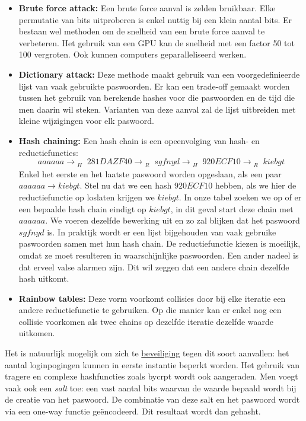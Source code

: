 \documentclass{report}
\begin{document}
	\begin{itemize} 
		\item[\info] \textbf{Brute force attack:} Een brute force aanval is zelden bruikbaar. Elke permutatie van bits uitproberen is enkel nuttig bij een klein aantal bits. Er bestaan wel methoden om de snelheid van een brute force aanval te verbeteren. Het gebruik van een GPU kan de snelheid met een factor 50 tot 100 vergroten. Ook kunnen computers geparalleliseerd werken.
		\item[\info] \textbf{Dictionary attack:} Deze methode maakt gebruik van een voorgedefinieerde lijst van vaak gebruikte paswoorden. Er kan een trade-off gemaakt worden tussen het gebruik van berekende hashes voor die paswoorden en de tijd die men daarin wil steken. Varianten van deze aanval zal de lijst uitbreiden met kleine wijzigingen voor elk paswoord.
		\item[\info] \textbf{Hash chaining:} Een hash chain is een opeenvolging van hash- en reductiefuncties:
		$$aaaaaa \rightarrow_{\substack{H}} 281DAZF40 \rightarrow_{\substack{R}}  sgfnyd \rightarrow_{\substack{H}}  920ECF10 \rightarrow_{\substack{R}}  kiebgt$$
		Enkel het eerste en het laatste paswoord worden opgeslaan, als een paar $aaaaaa \rightarrow kiebgt$. Stel nu dat we een hash $920ECF10$ hebben, als we hier de reductiefunctie op loslaten krijgen we $kiebgt$.  In onze tabel zoeken we op of er een bepaalde hash chain eindigt op $kiebgt$, in dit geval start deze chain met $aaaaaa$. We voeren dezelfde bewerking uit en zo zal blijken dat het paswoord $sgfnyd$ is. In praktijk wordt er een lijst bijgehouden van vaak gebruike paswoorden samen met hun hash chain. De reductiefunctie kiezen is moeilijk, omdat ze moet resulteren in waarschijnlijke paswoorden. Een ander nadeel is dat erveel valse alarmen zijn. Dit wil zeggen dat een andere chain dezelfde hash uitkomt. 
		\item[\info] \textbf{Rainbow tables:} Deze vorm voorkomt collisies door bij elke iteratie een andere reductiefunctie te gebruiken. Op die manier kan er enkel nog een collisie voorkomen als twee chains op dezelfde iteratie dezelfde waarde uitkomen.
	\end{itemize}
	Het is natuurlijk mogelijk om zich te \underline{beveiliging} tegen dit soort aanvallen: het aantal loginpogingen kunnen in eerste instantie beperkt worden. Het gebruik van tragere en complexe hashfuncties zoals bycrpt wordt ook aangeraden. Men voegt vaak ook een \emph{salt} toe: een vast aantal bits waarvan de waarde bepaald wordt bij de creatie van het paswoord. De combinatie van deze salt en het paswoord wordt via een one-way functie geëncodeerd. Dit resultaat wordt dan gehasht.
\end{document}
